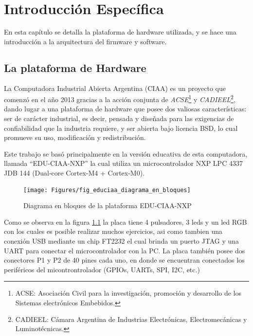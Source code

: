 \chapter{Introducción Específica} %

\label{Chapter2}

En esta capítulo se detalla la plataforma de hardware utilizada, y se hace una introducción a la arquitectura del firmware y software.
\section{La plataforma de Hardware}
\label{sec:plataforma}

La Computadora Industrial Abierta Argentina (CIAA) es un proyecto que comenzó en el año 2013 
gracias a la acción conjunta de \textit{ACSE}\footnote{ACSE: Asociación Civil para la investigación, promoción y desarrollo de los Sistemas electrónicos Embebidos.} y \textit{CADIEEL}\footnote{CADIEEL: Cámara Argentina de Industrias Electrónicas, Electromecánicas y Luminotécnicas.}, dando lugar a una plataforma de hardware que posee dos valiosas características: ser de carácter industrial, es decir, pensada y diseñada para las exigencias de confiabilidad que la industria requiere, y ser abierta bajo licencia BSD, lo cual promueve su uso, modificación y redistribución.

Este trabajo se basó principalmente en la versión educativa de esta computadora, llamada “EDU-CIAA-NXP” la cual utiliza un microcontrolador NXP LPC 4337 JDB 144 (Dual-core Cortex-M4 + Cortex-M0).

\begin{figure}[ht]
  \centering
    \texttt{[image: Figures/fig\_educiaa\_diagrama\_en\_bloques]}
  \caption{Diagrama en bloques de la plataforma EDU-CIAA-NXP}
  \label{fig:educiaaBloques}
\end{figure}

Como se observa en la figura \ref{fig:educiaaBloques} la placa tiene 4 pulsadores, 3 leds y un led RGB con los cuales es posible realizar muchos ejercicios, asi como tambien una conexión USB mediante un chip FT2232 el cual brinda un puerto JTAG y una UART para conectar el microcontrolador con la PC.
La placa también posee dos conectores P1 y P2 de 40 pines cada uno, en donde se encuentran conectados los periféricos del micontrontrolador (GPIOs, UARTs, SPI, I2C, etc.)


